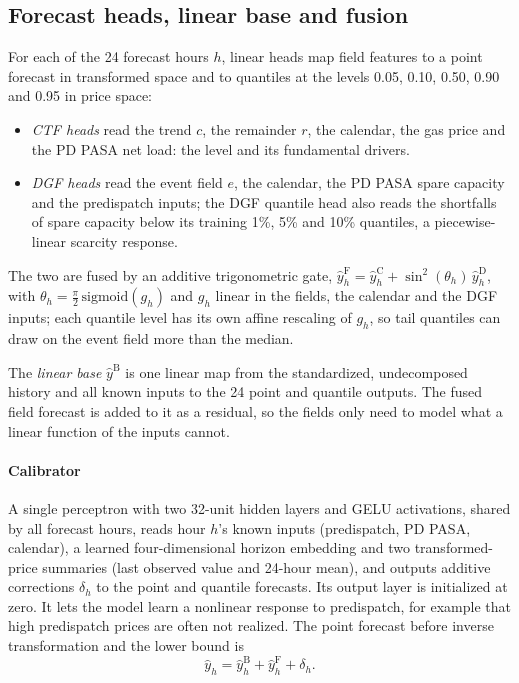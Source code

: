 \documentclass[preprint,12pt]{elsarticle}
\begin{document}
\subsection{Forecast heads, linear base and fusion}
For each of the 24 forecast hours $h$, linear heads map field features to a point forecast in transformed space and to quantiles at the levels 0.05, 0.10, 0.50, 0.90 and 0.95 in price space:
\begin{itemize}
\item \emph{CTF heads} read the trend $c$, the remainder $r$, the calendar, the gas price and the PD PASA net load: the level and its fundamental drivers.
\item \emph{DGF heads} read the event field $e$, the calendar, the PD PASA spare capacity and the predispatch inputs; the DGF quantile head also reads the shortfalls of spare capacity below its training 1\%, 5\% and 10\% quantiles, a piecewise-linear scarcity response.
\end{itemize}
The two are fused by an additive trigonometric gate, $\hat y^{\mathrm{F}}_h=\hat y^{\mathrm{C}}_h+\sin^2(\theta_h)\,\hat y^{\mathrm{D}}_h$, with $\theta_h=\tfrac{\pi}{2}\,\mathrm{sigmoid}(g_h)$ and $g_h$ linear in the fields, the calendar and the DGF inputs; each quantile level has its own affine rescaling of $g_h$, so tail quantiles can draw on the event field more than the median.

The \emph{linear base} $\hat y^{\mathrm{B}}$ is one linear map from the standardized, undecomposed history and all known inputs to the 24 point and quantile outputs. The fused field forecast is added to it as a residual, so the fields only need to model what a linear function of the inputs cannot.

\paragraph{Calibrator} A single perceptron with two 32-unit hidden layers and GELU activations, shared by all forecast hours, reads hour $h$'s known inputs (predispatch, PD PASA, calendar), a learned four-dimensional horizon embedding and two transformed-price summaries (last observed value and 24-hour mean), and outputs additive corrections $\delta_h$ to the point and quantile forecasts. Its output layer is initialized at zero. It lets the model learn a nonlinear response to predispatch, for example that high predispatch prices are often not realized. The point forecast before inverse transformation and the lower bound is
\begin{equation}
\hat y_h=\hat y^{\mathrm{B}}_h+\hat y^{\mathrm{F}}_h+\delta_h .
\end{equation}
\end{document}
